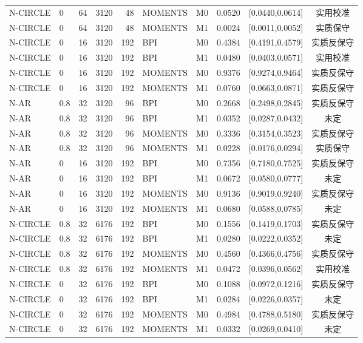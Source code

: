 \documentclass[UTF8,zihao=-4]{ctexart}
\theoremstyle{remark}
\begin{document}
\begin{longtable}{llrlrlrrc c}
N-CIRCLE & 0 & 64 & 3120 & 48 & MOMENTS & M0 & 0.0520 & [0.0440,0.0614] & 实用校准\\
N-CIRCLE & 0 & 64 & 3120 & 48 & MOMENTS & M1 & 0.0024 & [0.0011,0.0052] & 实质保守\\
N-CIRCLE & 0 & 16 & 3120 & 192 & BPI & M0 & 0.4384 & [0.4191,0.4579] & 实质反保守\\
N-CIRCLE & 0 & 16 & 3120 & 192 & BPI & M1 & 0.0480 & [0.0403,0.0571] & 实用校准\\
N-CIRCLE & 0 & 16 & 3120 & 192 & MOMENTS & M0 & 0.9376 & [0.9274,0.9464] & 实质反保守\\
N-CIRCLE & 0 & 16 & 3120 & 192 & MOMENTS & M1 & 0.0760 & [0.0663,0.0871] & 实质反保守\\
N-AR & 0.8 & 32 & 3120 & 96 & BPI & M0 & 0.2668 & [0.2498,0.2845] & 实质反保守\\
N-AR & 0.8 & 32 & 3120 & 96 & BPI & M1 & 0.0352 & [0.0287,0.0432] & 未定\\
N-AR & 0.8 & 32 & 3120 & 96 & MOMENTS & M0 & 0.3336 & [0.3154,0.3523] & 实质反保守\\
N-AR & 0.8 & 32 & 3120 & 96 & MOMENTS & M1 & 0.0228 & [0.0176,0.0294] & 实质保守\\
N-AR & 0 & 16 & 3120 & 192 & BPI & M0 & 0.7356 & [0.7180,0.7525] & 实质反保守\\
N-AR & 0 & 16 & 3120 & 192 & BPI & M1 & 0.0672 & [0.0580,0.0777] & 未定\\
N-AR & 0 & 16 & 3120 & 192 & MOMENTS & M0 & 0.9136 & [0.9019,0.9240] & 实质反保守\\
N-AR & 0 & 16 & 3120 & 192 & MOMENTS & M1 & 0.0680 & [0.0588,0.0785] & 未定\\
N-CIRCLE & 0.8 & 32 & 6176 & 192 & BPI & M0 & 0.1556 & [0.1419,0.1703] & 实质反保守\\
N-CIRCLE & 0.8 & 32 & 6176 & 192 & BPI & M1 & 0.0280 & [0.0222,0.0352] & 未定\\
N-CIRCLE & 0.8 & 32 & 6176 & 192 & MOMENTS & M0 & 0.4560 & [0.4366,0.4756] & 实质反保守\\
N-CIRCLE & 0.8 & 32 & 6176 & 192 & MOMENTS & M1 & 0.0472 & [0.0396,0.0562] & 实用校准\\
N-CIRCLE & 0 & 32 & 6176 & 192 & BPI & M0 & 0.1088 & [0.0972,0.1216] & 实质反保守\\
N-CIRCLE & 0 & 32 & 6176 & 192 & BPI & M1 & 0.0284 & [0.0226,0.0357] & 未定\\
N-CIRCLE & 0 & 32 & 6176 & 192 & MOMENTS & M0 & 0.4984 & [0.4788,0.5180] & 实质反保守\\
N-CIRCLE & 0 & 32 & 6176 & 192 & MOMENTS & M1 & 0.0332 & [0.0269,0.0410] & 未定\\

\end{longtable}
\end{document}
